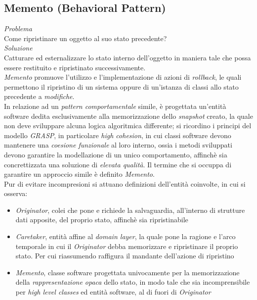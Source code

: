 \documentclass{article}
\begin{document}
\subsection*{Memento (Behavioral Pattern)}
\large
\textit{Problema}\\
Come ripristinare un oggetto al suo stato precedente?\vspace*{14pt}\\
\textit{Soluzione}\\
Catturare ed esternalizzare lo stato interno dell'oggetto in maniera tale che possa essere restituito e ripristinato successivamente.\vspace*{14pt}\\
\textit{Memento} promuove l'utilizzo e l'implementazione di azioni di \textit{rollback}, le quali permettono il ripristino di un sistema oppure di un'istanza di classi allo stato precedente a \textit{modifiche}.\vspace*{7pt}\\
In relazione ad un \textit{pattern comportamentale} simile, è progettata un'entità software dedita esclusivamente alla memorizzazione dello \textit{snapshot} creato, la quale non deve sviluppare alcuna logica algoritmica differente; si ricordino i principi del modello \textit{GRASP}, in particolare \textit{high cohesion}, in cui classi software devono mantenere una \textit{coesione funzionale} al loro interno, ossia i metodi sviluppati devono garantire la modellazione di un unico comportamento, affinchè sia concrettizzata una soluzione di \textit{elevata qualità}. Il termine che si occuppa di garantire un approccio simile è definito \textit{Memento}.\vspace*{7pt}\\
Pur di evitare incompresioni si attuano definizioni dell'entità coinvolte, in cui si osserva:
\begin{itemize}[label={-}]
    \itemsep0em
    \item \textit{Originator}, colei che pone e richiede la salvaguardia, all'interno di strutture dati apposite, del proprio stato, affinchè sia ripristinabile 
    \item \textit{Caretaker}, entità affine al \textit{domain layer}, la quale pone la ragione e l'arco temporale in cui il \textit{Originator} debba memorizzare e ripristinare il proprio stato. Per cui riassumendo raffigura il mandante dell'azione di ripristino
    \item \textit{Memento}, classe software progettata univocamente per la memorizzazione della \textit{rappresentazione opaca} dello stato, in modo tale che sia incomprensibile per \textit{high level classes} ed entità software, al di fuori di \textit{Originator} 
\end{itemize}
\end{document}
